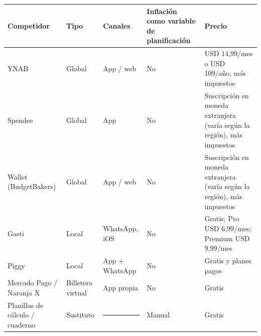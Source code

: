 {\def\LTcaptype{none} %
\begin{longtable}[]{@{}
  >{\raggedright\arraybackslash}p{}
  >{\raggedright\arraybackslash}p{}
  >{\raggedright\arraybackslash}p{}
  >{\raggedright\arraybackslash}p{}
  >{\raggedright\arraybackslash}p{}@{}}
\toprule\noalign{}
\begin{minipage}[b]{\linewidth}\raggedright
Competidor
\end{minipage} & \begin{minipage}[b]{\linewidth}\raggedright
Tipo
\end{minipage} & \begin{minipage}[b]{\linewidth}\raggedright
Canales
\end{minipage} & \begin{minipage}[b]{\linewidth}\raggedright
Inflación como variable de planificación
\end{minipage} & \begin{minipage}[b]{\linewidth}\raggedright
Precio
\end{minipage} \\
\midrule\noalign{}
\endhead
\bottomrule\noalign{}
\endlastfoot
YNAB & Global & App / web & No & USD 14,99/mes o USD 109/año, más
impuestos \\
Spendee & Global & App & No & Suscripción en moneda extranjera (varía
según la región), más impuestos \\
Wallet (BudgetBakers) & Global & App / web & No & Suscripción en moneda
extranjera (varía según la región), más impuestos \\
Gasti & Local & WhatsApp, iOS & No & Gratis; Pro USD 6,99/mes; Premium
USD 9,99/mes \\
Piggy & Local & App + WhatsApp & No & Gratis y planes pagos \\
Mercado Pago / Naranja X & Billetera virtual & App propia & No &
Gratis \\
Planillas de cálculo / cuaderno & Sustituto &
\begin{minipage}[t]{\linewidth}\raggedright
\begin{center}\rule{0.5\linewidth}{0.5pt}\end{center}
\end{minipage} & Manual & Gratis \\
\end{longtable}
}

